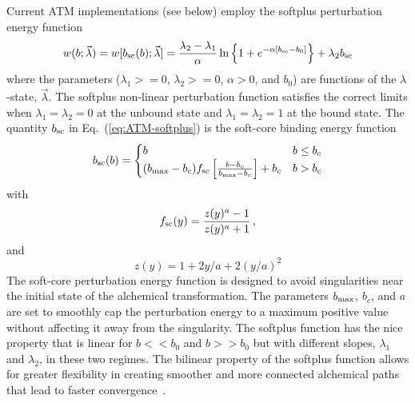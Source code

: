 \documentclass[9pt,bestpractices]{livecoms}
\begin{document}
Current ATM implementations (see below) employ the softplus perturbation energy function\cite{pal2019perturbation}
\begin{equation}\label{eq:ATM-softplus}
w(b;\vec{\lambda}) = w[b_{\rm sc}(b);\vec{\lambda}] =  \frac{\lambda_2 - \lambda_1}{\alpha} \ln\left\{ 1 + e^{-\alpha [b_{\rm sc} - b_0]} \right\} + \lambda_2 b_{\rm sc}
\end{equation}
where the parameters ($\lambda_1>=0$, $\lambda_2>=0$, $\alpha>0$, and $b_0$) are functions of the $\lambda$-state, $\vec{\lambda}$. The softplus non-linear perturbation function satisfies the correct limits when $\lambda_1 = \lambda_2 = 0$ at the unbound state and $\lambda_1 = \lambda_2 = 1$ at the bound state. The quantity $b_{\rm sc}$ in Eq.~(\ref{eq:ATM-softplus}) is the soft-core binding energy function
\begin{equation}
  b_{\rm sc}(b)=
\begin{cases}
b & b \le b_c \\
(b_{\rm max} - b_c ) f_{\rm sc}\left[\frac{b-b_c}{b_{\rm max}-b_c}\right] + b_c & b > b_c
\end{cases}
\label{eq:ATM-soft-core-general}
\end{equation}
with
\begin{equation}
f_{\rm sc}(y) = \frac{z(y)^{a}-1}{z(y)^{a}+1} \label{eq:rat-sc} \, ,
\end{equation}
and
\begin{equation}
    z(y)=1+2 y/a + 2 (y/a)^2
    \label{eq:end-of-softplus}
\end{equation}
The soft-core perturbation energy function is designed to avoid singularities near the initial state of the alchemical transformation.\cite{pal2019perturbation,khuttan2021alchemical} The parameters $b_{\rm max}$, $b_c$, and $a$ are set to smoothly cap the perturbation energy to a maximum positive value without affecting it away from the singularity. 
The softplus function has the nice property that is linear for $b<<b_0$ and $b>>b_0$ but with different slopes,  $\lambda_1$ and $\lambda_2$, in these two regimes. The bilinear property of the softplus function allows for greater flexibility in creating smoother and more connected alchemical paths that lead to faster convergence~\cite{pal2019perturbation, khuttan2021alchemical}.
\end{document}
